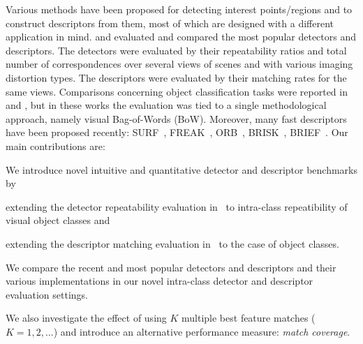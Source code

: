 \documentclass[journal]{IEEEtran}
\begin{document}
Various methods have been proposed for detecting interest
points/regions and to construct descriptors from them,
most of which are designed with a different application in mind.
\cite{MikTuySch:2005}
and \cite{MikSch:2005} evaluated and
compared the most popular detectors and descriptors. The detectors
were evaluated by their repeatability ratios and total number of 
correspondences over several views of scenes and with various
imaging distortion types.
The descriptors were evaluated by their matching
rates for the same views. Comparisons concerning object classification
tasks were
reported in \cite{ZhaMarLaz:2006} and
\cite{MikLeiSch:2005}, but in these works
the evaluation was tied to a single methodological approach,
namely visual Bag-of-Words (BoW). Moreover, many fast descriptors
have been proposed recently: SURF~\cite{BayEssTuy:2008},
FREAK~\cite{freak}, ORB~\cite{orb}, BRISK~\cite{brisk},
BRIEF~\cite{brief}. Our main contributions are:
\begin{compactitem}
\item We introduce novel intuitive and quantitative detector and descriptor benchmarks by
  \begin{compactitem}
  \item extending the detector repeatability evaluation
    in~\cite{MikTuySch:2005} to intra-class repeatibility of visual object classes and
  \item extending the descriptor matching evaluation in~\cite{MikSch:2005} to
    the case of object classes.
  \end{compactitem}
\item We compare the recent and most popular detectors and descriptors and their various 
  implementations in our novel intra-class detector and descriptor evaluation settings.
\item We also investigate the effect of using $K$ multiple best feature matches ($K=1,2,\ldots$) and
  introduce an alternative performance measure: {\em match coverage}.
\end{compactitem}
\end{document}

